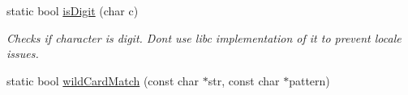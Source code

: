 \begin{DoxyCompactItemize}
\item 
\hypertarget{a00087_a4caae91dfe0310d9f182bd9b7e99103c}{}static bool \hyperlink{a00087_a4caae91dfe0310d9f182bd9b7e99103c}{is\+Digit} (char c)\label{a00087_a4caae91dfe0310d9f182bd9b7e99103c}

\begin{DoxyCompactList}\small\item\em Checks if character is digit. Dont use libc implementation of it to prevent locale issues. \end{DoxyCompactList}\item 
\hypertarget{a00087_a95e007a25dfcbd77d4c573b0f73b3153}{}static bool \hyperlink{a00087_a95e007a25dfcbd77d4c573b0f73b3153}{wild\+Card\+Match} (const char $\ast$str, const char $\ast$pattern)\label{a00087_a95e007a25dfcbd77d4c573b0f73b3153}


\end{DoxyCompactItemize}
